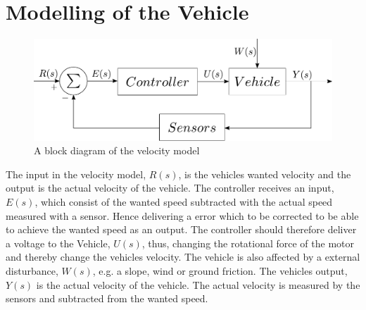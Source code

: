 \chapter{Modelling of the Vehicle}

\begin{figure}[H]
	\centering
	\includegraphics[scale=0.6]{figures/StartTotalModelsystem.pdf}
	\caption{A block diagram of the velocity model}
	\label{fig:StartTotalModelsystem}
\end{figure}

The input in the velocity model, $R(s)$, is the vehicles wanted velocity and the output is the actual velocity of the vehicle. The controller receives an input, $E(s)$, which consist of the wanted speed subtracted with the actual speed measured with a sensor. Hence delivering a error which to be corrected to be able to achieve the wanted speed as an output. The controller should therefore deliver a voltage to the Vehicle, $U(s)$, thus, changing the rotational force of the motor and thereby change the vehicles velocity. The vehicle is also affected by a external disturbance, $W(s)$, e.g. a slope, wind or ground friction. The vehicles output, $Y(s)$ is the actual velocity of the vehicle. The actual velocity is measured by the sensors and subtracted from the wanted speed.